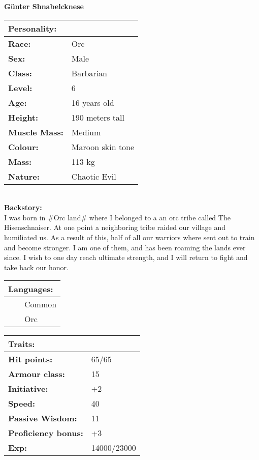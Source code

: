 \documentclass[11pt]{article}
\newcommand{\tabitem}{~~\llap{--}~~}
\begin{document}
	\begin{center}
\Huge \textbf{Günter Shnabelcknese}
	\end{center}
	\begin{multicols}{2}
\noindent \begin{tabularx}{95mm}{@{}l l}
\Large \textbf{Personality:} 	& 						\\
\hline
\textbf{Race:} 					& Orc		 			\\
\textbf{Sex:} 					& Male	 				\\
\textbf{Class:}					& Barbarian				\\
\textbf{Level:} 				& 6						\\
\textbf{Age:} 					& 16 years old			\\
\textbf{Height:} 				& 190 meters tall 		\\
\textbf{Muscle Mass:} 			& Medium 				\\
\textbf{Colour:} 				& Maroon skin tone	 	\\
\textbf{Mass:} 					& 113 kg		 		\\
\textbf{Nature:} 				& Chaotic Evil
		\end{tabularx} \\
\textbf{Backstory:} \\
I was born in \#Orc land\# where I belonged to a an orc tribe called The Hisenschnaiser. At one point a neighboring tribe raided our village and humiliated us. As a result of this, half of all our warriors where sent out to train and become stronger. I am one of them, and has been roaming the lands ever since. I wish to one day reach ultimate strength, and I will return to fight and take back our honor.

\vspace{4mm}

\noindent \begin{tabularx}{95mm}{@{}l}
{\Large \textbf{Languages:}} \\
\hline
\tabitem Common \\
\tabitem Orc \\
		\end{tabularx}

\vspace{4mm}

\noindent \begin{tabularx}{95mm}{@{}l l}
\Large \textbf{Traits:}		 	& 									\\
\hline
\textbf{Hit points:} 			& 65/65  							\\
\textbf{Armour class:} 			& 15							 	\\
\textbf{Initiative:} 			& +2								\\
\textbf{Speed:} 				& 40	 							\\
\textbf{Passive Wisdom:} 		& 11			 					\\
\textbf{Proficiency bonus:}		& +3								\\
\textbf{Exp:} 					& 14000/23000
		\end{tabularx}


\end{multicols}
\end{document}
